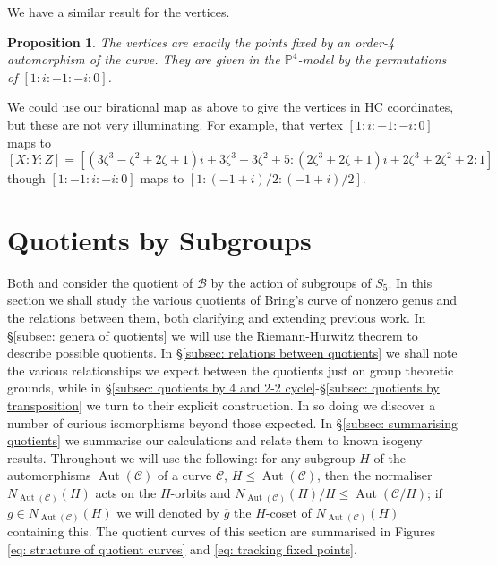 \documentclass{amsart}
\newtheorem{prop}[theorem]{Proposition}
\DeclareMathOperator{\Aut}{Aut}
\begin{document}
We have a similar result for the vertices. 
\begin{prop}\label{Vprop}
The vertices are exactly the points fixed by an order-4 automorphism of the curve. They are given in the $\mathbb{P}^4$-model by the permutations of $[1: i: -1: -i: 0]$.
\end{prop}
We could use our birational map as above to give the vertices in HC coordinates, but these are not very illuminating. For example, that vertex $[1:i:-1:-i:0]$ maps to
\[
[X : Y : Z] = [(3\zeta^3 - \zeta^2 + 2\zeta + 1)i + 3\zeta^3 + 3\zeta^2 + 5 : (2\zeta^3 + 2\zeta + 1)i + 2\zeta^3 + 2\zeta^2 + 2 : 1]
\]
though $[1:-1:i:-i:0]$ maps to $[1: (-1+i)/2: (-1+i)/2]$.
\section{Quotients by Subgroups}\label{sec: quotients by subgroups}

Both \cite{Riera1992} and \cite{Weber2005} consider the quotient of $\mathcal{B}$ by the action of subgroups of $S_5$.
In this section we shall study the various quotients of Bring's curve of nonzero genus and the relations between them, both clarifying and extending previous work. In \S\ref{subsec: genera of quotients} we will use the Riemann-Hurwitz theorem to describe possible quotients.
In \S\ref{subsec: relations between quotients} we shall note the various relationships we expect between the quotients just on group theoretic grounds, while in \S\ref{subsec: quotients by 4 and 2-2 cycle}-\S\ref{subsec: quotients by transposition} we turn to their explicit construction. In so doing we discover a number of curious isomorphisms beyond those expected. In \S\ref{subsec: summarising quotients} we summarise our calculations and relate them to known isogeny results.  Throughout we will use the following: for any subgroup $H$ of the automorphisms $\Aut(\mathcal{C})$ of a curve
 $\mathcal{C}$,  $H\le \Aut(\mathcal{C})$,
then the normaliser $N_{\Aut(\mathcal{C})}(H)$ acts on the $H$-orbits
and $N_{\Aut(\mathcal{C})}(H)/H \le \Aut(\mathcal{C}/H)$; if $g\in N_{\Aut(\mathcal{C})}(H) $ we will denoted by $\overline{g}$ the $H$-coset of $N_{\Aut(\mathcal{C})}(H)$ containing this.
The quotient curves of this section are summarised in Figures \ref{eq: structure of quotient curves} and \ref{eq: tracking fixed points}.
\end{document}
